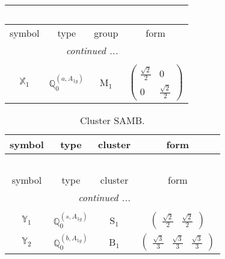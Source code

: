 \documentclass[fleqn,10pt,landscape]{article}
\begin{document}
\begin{itemize}
\begin{center}
\begin{longtable}{c|c|c|c}
\multicolumn{3}{l}{\tablename\ \thetable{}} \\
 \hline \hline
symbol & type & group & form \\ \hline \endhead

 \hline \hline
\multicolumn{3}{r}{\footnotesize\it continued ...} \\ \endfoot

 \hline \hline
\multicolumn{3}{r}{} \\ \endlastfoot

$ \mathbb{X}_{1} $ & $\mathbb{Q}_{0}^{(a,A_{1g})}$ & M$_{1}$ & $\begin{pmatrix} \frac{\sqrt{2}}{2} & 0 \\ 0 & \frac{\sqrt{2}}{2} \end{pmatrix}$ \\
\end{longtable}
\end{center}
\begin{center}
\renewcommand{\arraystretch}{1.3}
\begin{longtable}{c|c|c|c}
\caption{Cluster SAMB.}
 \\
 \hline \hline
symbol & type & cluster & form \\ \hline \endfirsthead

\multicolumn{3}{l}{\tablename\ \thetable{}} \\
 \hline \hline
symbol & type & cluster & form \\ \hline \endhead

 \hline \hline
\multicolumn{3}{r}{\footnotesize\it continued ...} \\ \endfoot

 \hline \hline
\multicolumn{3}{r}{} \\ \endlastfoot

$ \mathbb{Y}_{1} $ & $\mathbb{Q}_{0}^{(s,A_{1g})}$ & S$_{1}$ & $\begin{pmatrix} \frac{\sqrt{2}}{2} & \frac{\sqrt{2}}{2} \end{pmatrix}$ \\ \hline
$ \mathbb{Y}_{2} $ & $\mathbb{Q}_{0}^{(b,A_{1g})}$ & B$_{1}$ & $\begin{pmatrix} \frac{\sqrt{3}}{3} & \frac{\sqrt{3}}{3} & \frac{\sqrt{3}}{3} \end{pmatrix}$ \\
\end{longtable}
\end{center}


\end{itemize}
\end{document}
